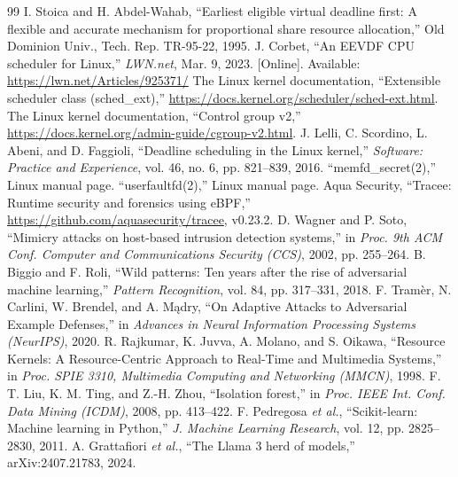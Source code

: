 \documentclass[conference]{IEEEtran}
\begin{document}
\begin{thebibliography}{99}
 I. Stoica and H. Abdel-Wahab, ``Earliest eligible virtual
deadline first: A flexible and accurate mechanism for proportional share
resource allocation,'' Old Dominion Univ., Tech. Rep. TR-95-22, 1995.
 J. Corbet, ``An EEVDF CPU scheduler for Linux,''
\emph{LWN.net}, Mar. 9, 2023. [Online]. Available:
\url{https://lwn.net/Articles/925371/}
 The Linux kernel documentation, ``Extensible scheduler
class (sched\_ext),'' \url{https://docs.kernel.org/scheduler/sched-ext.html}.
 The Linux kernel documentation, ``Control group v2,''
\url{https://docs.kernel.org/admin-guide/cgroup-v2.html}.
 J. Lelli, C. Scordino, L. Abeni, and D. Faggioli,
``Deadline scheduling in the Linux kernel,'' \emph{Software: Practice and
Experience}, vol. 46, no. 6, pp. 821--839, 2016.
 ``memfd\_secret(2),'' Linux manual page.
 ``userfaultfd(2),'' Linux manual page.
 Aqua Security, ``Tracee: Runtime security and forensics using
eBPF,'' \url{https://github.com/aquasecurity/tracee}, v0.23.2.
 D. Wagner and P. Soto, ``Mimicry attacks on
host-based intrusion detection systems,'' in \emph{Proc. 9th ACM Conf. Computer
and Communications Security (CCS)}, 2002, pp. 255--264.
 B. Biggio and F. Roli, ``Wild patterns: Ten years after
the rise of adversarial machine learning,'' \emph{Pattern Recognition}, vol.
84, pp. 317--331, 2018.
 F. Tram\`er, N. Carlini, W. Brendel, and
A. M\k{a}dry, ``On Adaptive Attacks to Adversarial Example Defenses,'' in
\emph{Advances in Neural Information Processing Systems (NeurIPS)}, 2020.
 R. Rajkumar, K. Juvva, A. Molano, and S.
Oikawa, ``Resource Kernels: A Resource-Centric Approach to Real-Time and
Multimedia Systems,'' in \emph{Proc. SPIE 3310, Multimedia Computing and
Networking (MMCN)}, 1998.
 F. T. Liu, K. M. Ting, and Z.-H. Zhou, ``Isolation forest,''
in \emph{Proc. IEEE Int. Conf. Data Mining (ICDM)}, 2008, pp. 413--422.
 F. Pedregosa \emph{et al.}, ``Scikit-learn: Machine learning
in Python,'' \emph{J. Machine Learning Research}, vol. 12, pp. 2825--2830, 2011.
 A. Grattafiori \emph{et al.}, ``The Llama 3 herd of models,''
arXiv:2407.21783, 2024.
\end{thebibliography}
\end{document}

